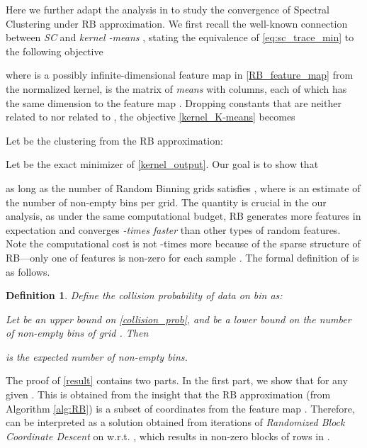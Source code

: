 \documentclass[sigconf]{acmart}
\newtheorem{definition}{Definition}
\newcommand{\1}{\boldsymbol{1}}
\newcommand{\0}{\boldsymbol{0}}
\begin{document}
Here we further adapt the analysis in \cite{wu2016revisiting} to study the convergence of Spectral Clustering under RB approximation. We first recall the well-known connection between \emph{SC} and \emph{kernel -means} \cite{dhillon2004kernel}, stating the equivalence of \eqref{eq:sc_trace_min} to the following objective

where  is a possibly infinite-dimensional feature map in \eqref{RB_feature_map} from the normalized kernel,  is the matrix of \emph{means} with  columns, each of which has the same dimension to the feature map . Dropping constants that are neither related to  nor related to , the objective \eqref{kernel_K-means} becomes

Let  be the clustering from the RB approximation:

Let  be the exact minimizer of \eqref{kernel_output}. Our goal is to show that 

as long as the number of Random Binning grids satisfies , where  is an estimate of the number of non-empty bins per grid. The quantity  is crucial in the our analysis, as under the same computational budget, RB generates  more features in expectation and converges \emph{-times faster} than other types of random features. Note the computational cost is not -times more because of the sparse structure of RB---only one of  features is non-zero for each sample . The formal definition of  is as follows.

\begin{definition}\label{def:collision_prob}
Define the collision probability of data  on bin  as: 

Let  be an upper bound on \eqref{collision_prob}, and  be a lower bound on the number of non-empty bins of grid . Then

is the expected number of non-empty bins.
\end{definition}

The proof of \eqref{result} contains two parts. In the first part, we show that  for any given . This is obtained from the insight that the RB approximation  (from Algorithm \ref{alg:RB}) is a subset of coordinates from the feature map . Therefore,  can be interpreted as a solution obtained from  iterations of \emph{Randomized Block Coordinate Descent} on  w.r.t. , which results in  non-zero blocks of rows in .
\end{document}
